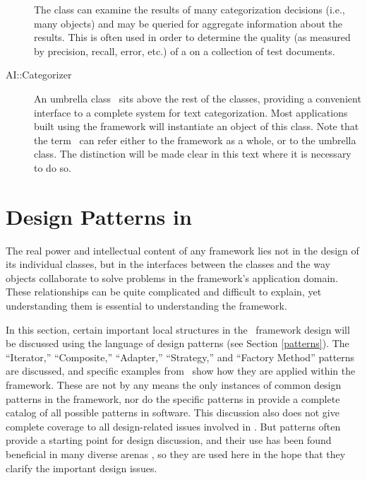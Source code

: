 \begin{description}
The  class can examine the results of many categorization
decisions (i.e., many  objects) and may be queried for
aggregate information about the results.  This is often used in order
to determine the quality (as measured by precision, recall, error,
etc.) of a  on a collection of test documents.

\item[AI::Categorizer]

An umbrella class \aicat\ sits above the rest of the classes,
providing a convenient interface to a complete system for text
categorization.  Most applications built using the framework will
instantiate an object of this class.  Note that the term \aicat\ can
refer either to the framework as a whole, or to the umbrella class.
The distinction will be made clear in this text where it is necessary
to do so.

\end{description}

\section{Design Patterns in \aicat}

The real power and intellectual content of any framework lies not in
the design of its individual classes, but in the interfaces between
the classes and the way objects collaborate to solve problems in the
framework's application domain. \cite[p. 31]{fayad:99} These
relationships can be quite complicated and difficult to explain, yet
understanding them is essential to understanding the framework.

In this section, certain important local structures in the \aicat\
framework design will be discussed using the language of design
patterns (see Section \ref{patterns}).  The ``Iterator,'' ``Composite,'' ``Adapter,'' ``Strategy,''
and ``Factory Method'' patterns are discussed, and specific examples
from \aicat\ show how they are applied within the framework.  These
are not by any means the only instances of common design patterns in
the framework, nor do the specific patterns in \cite{gamma:95} provide
a complete catalog of all possible patterns in software.  This
discussion also does not give complete coverage to all design-related
issues involved in \aicat.  But patterns often provide a starting
point for design discussion, and their use has been found beneficial
in many diverse arenas \cite{granlund:99}, so they are used here in
the hope that they clarify the important design issues.

